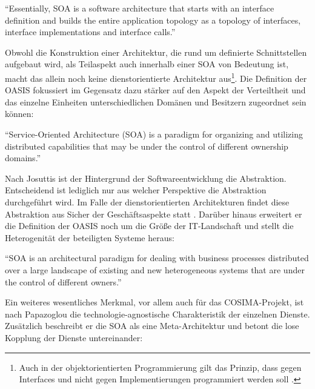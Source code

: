 \begin{definition}\label{def:soa_natis_2003_}
  "`Essentially, SOA is a software architecture that starts with an interface definition and builds the entire application topology as a topology of interfaces, interface implementations and interface calls."' \emph{\citep[S. 2]{natis2003soa}}
\end{definition}

  Obwohl die Konstruktion einer Architektur, die rund um definierte Schnittstellen aufgebaut wird, als Teilaspekt auch innerhalb einer SOA von Bedeutung ist, macht das allein noch keine dienstorientierte Architektur aus\footnote{Auch in der objektorientierten Programmierung gilt das Prinzip, dass gegen Interfaces und nicht gegen Implementierungen programmiert werden soll \citep[S. 18]{design_patterns}.}. Die Definition der OASIS fokussiert im Gegensatz dazu stärker auf den Aspekt der Verteiltheit und das einzelne Einheiten unterschiedlichen Domänen und Besitzern zugeordnet sein können:

\begin{definition}\label{def:soa_oasis_reference_model_}
  "`Service-Oriented Architecture (SOA) is a paradigm for organizing and utilizing distributed capabilities that may be under the control of different ownership domains."' \emph{\citep[S. 8]{mackenzie2006rms}}
\end{definition}

  Nach Josuttis ist der Hintergrund der Softwareentwicklung die Abstraktion. Entscheidend ist lediglich nur aus welcher Perspektive die Abstraktion durchgeführt wird. Im Falle der dienstorientierten Architekturen findet diese Abstraktion aus Sicher der Geschäftsaspekte statt \citep[S. 16]{soa_in_practice}. Darüber hinaus erweitert er die Definition der OASIS noch um die Größe der IT-Landschaft und stellt die Heterogenität der beteiligten Systeme heraus:

\begin{definition}\label{def:soa_josuttis_}
  "`SOA is an architectural paradigm for dealing with business processes distributed over a large landscape of existing and new heterogeneous systems that are under the control of different owners."' \emph{\citep[S. 24]{soa_in_practice}}
\end{definition}

  Ein weiteres wesentliches Merkmal, vor allem auch für das COSIMA-Projekt, ist nach Papazoglou die technologie-agnostische Charakteristik der einzelnen Dienste. Zusätzlich beschreibt er die SOA als eine Meta-Architektur und betont die lose Kopplung der Dienste untereinander:

